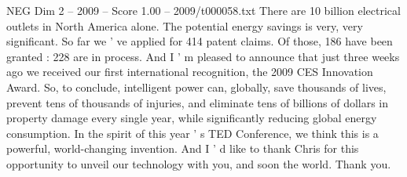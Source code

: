 \begin{textsample}{NEG Dim 2 – 2009 – Score 1.00 – 2009/t000058.txt}
There are 10 billion electrical outlets in North America alone.
The potential energy savings is very, very significant.
So far we ' ve applied for 414 patent claims.
Of those, 186 have been granted : 228 are in process.
And I ' m pleased to announce that just three weeks ago we received our first international recognition, the 2009 CES Innovation Award.
So, to conclude, intelligent power can, globally, save thousands of lives, prevent tens of thousands of injuries, and eliminate tens of billions of dollars in property damage every single year, while significantly reducing global energy consumption.
In the spirit of this year ' s TED Conference, we think this is a powerful, world-changing invention.
And I ' d like to thank Chris for this opportunity to unveil our technology with you, and soon the world.
Thank you.

\end{textsample}
